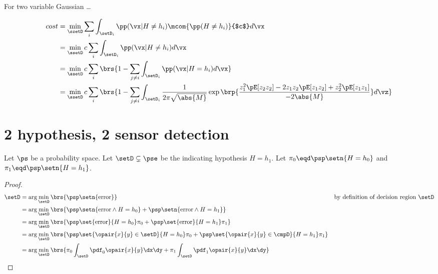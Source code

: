 For two variable Gaussian \ldots

\begin{align*}
  cost
    &= \min_\ssetD \sum_i \int_{\setD_i} \pp(\vx|H\ne h_i)\mcom{\pp(H\ne h_i)}{$c$} d\vx
  \\&= \min_\ssetD c\sum_i \int_{\setD_i} \pp(\vx|H\ne h_i) d\vx 
  \\&= \min_\ssetD c\sum_i\brs{1- \sum_{j\ne i}\int_{\setD_i} \pp(\vx|H=h_i) d\vx} 
  \\&= \min_\ssetD c\sum_i \brs{1-\sum_{j\ne i}\int_{\setD_i} 
         \frac{1}{2\pi \sqrt{\abs{M}}}
         \exp\brp{\frac{z_1^2\pE[z_2z_2] - 2z_1z_2\pE[z_1z_2] + z_2^2\pE[z_1z_1]}
                       {-2\abs{M}}} d\vz}
\end{align*}


\section{2 hypothesis, 2 sensor detection}

\begin{theorem}
Let $\ps$ be a probability space.
Let $\setD\subsetneq\pse$ be the  indicating hypothesis $H=h_1$. 
Let $\pi_0\eqd\psp\setn{H=h_0}$ and $\pi_1\eqd\psp\setn{H=h_1}$.
\end{theorem}
\begin{proof}
\begin{align*}
  \setD 
    &= \arg\min_\setD\brs{\psp\setn{\text{error}}}
    && \text{by definition of decision region $\setD$}
  \\&= \arg\min_\setD\brs{
         \psp\setn{\text{error}\land H=h_0} +
         \psp\setn{\text{error}\land H=h_1}
         }
  \\&= \arg\min_\setD\brs{
         \psp\set{\text{error}}{H=h_0}\pi_0 +
         \psp\set{\text{error}}{H=h_1}\pi_1
         }
  \\&= \arg\min_\setD\brs{
         \psp\set{\opair{x}{y}\in\setD}{H=h_0}\pi_0 + 
         \psp\set{\opair{x}{y}\in\cmpD}{H=h_1}\pi_1
         }
  \\&= \arg\min_\setD\brs{
         \pi_0\int_\setD \pdf_0\opair{x}{y} \dx\dy + 
         \pi_1\int_\setD \pdf_1\opair{x}{y} \dx\dy 
         }
\end{align*}
\end{proof}

